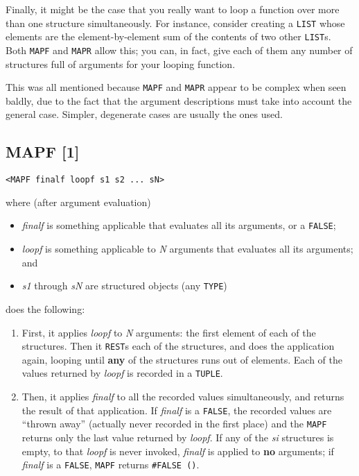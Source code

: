 \documentclass[a4paper]{scrbook}
\providecommand{\tightlist}{%
  \setlength{\itemsep}{0pt}\setlength{\parskip}{0pt}}
\begin{document}
Finally, it might be the case that you really want to loop a function over more than one structure simultaneously. For
instance, consider creating a \texttt{LIST} whose elements are the element-by-element sum of the contents of two other
\texttt{LIST}s. Both \texttt{MAPF} and \texttt{MAPR} allow this; you can, in fact, give each of them any number of
structures full of arguments for your looping function.

This was all mentioned because \texttt{MAPF} and \texttt{MAPR} appear to be complex when seen baldly, due to the fact that
the argument descriptions must take into account the general case. Simpler, degenerate cases are usually the ones used.

\subsection{MAPF {[}1{]}}\label{mapf-1}

\begin{verbatim}
<MAPF finalf loopf s1 s2 ... sN>
\end{verbatim}

 where (after argument evaluation)

\begin{itemize}
\tightlist
\item
  \emph{finalf} is something applicable that evaluates all its arguments, or a \texttt{FALSE};
\item
  \emph{loopf} is something applicable to \emph{N} arguments that evaluates all its arguments; and
\item
  \emph{s1} through \emph{sN} are structured objects (any \texttt{TYPE})
\end{itemize}

does the following:

\begin{enumerate}
\def\labelenumi{\arabic{enumi}.}
\tightlist
\item
  First, it applies \emph{loopf} to \emph{N} arguments: the first element of each of the structures. Then it \texttt{REST}s
  each of the structures, and does the application again, looping until \textbf{any} of the structures runs out of
  elements. Each of the values returned by \emph{loopf} is recorded in a \texttt{TUPLE}.
\item
  Then, it applies \emph{finalf} to all the recorded values simultaneously, and returns the result of that application. If
  \emph{finalf} is a \texttt{FALSE}, the recorded values are ``thrown away'' (actually never recorded in the first place)
  and the \texttt{MAPF} returns only the last value returned by \emph{loopf}. If any of the \emph{si} structures is empty,
  to that \emph{loopf} is never invoked, \emph{finalf} is applied to \textbf{no} arguments; if \emph{finalf} is a
  \texttt{FALSE}, \texttt{MAPF} returns \texttt{\#FALSE\ ()}.
\end{enumerate}
\end{document}
